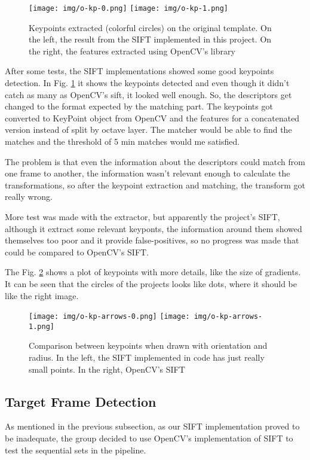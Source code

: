 \documentclass[]{IEEEtran}
\begin{document}
 \begin{figure}[H]
     \centering
     \texttt{[image: img/o-kp-0.png]}
     \texttt{[image: img/o-kp-1.png]}
     \caption{Keypoints extracted (colorful circles) on the original template. On the left, the result from the SIFT implemented in this project. On the right, the features extracted using OpenCV's library}
     \label{fig:keypoints}
 \end{figure}

 After some tests, the SIFT implementations showed some good keypoints detection. In Fig. \ref{fig:keypoints} it shows the keypoints detected and even though it didn't catch as many as OpenCV's sift, it looked well enough. So, the descriptors get changed to the format expected by the matching part. The keypoints got converted to KeyPoint object from OpenCV and the features for a concatenated version instead of split by octave layer. The matcher would be able to find the matches and the threshold of 5 min matches would me satisfied.

 The problem is that even the information about the descriptors could match from one frame to another, the information wasn't relevant enough to calculate the transformations, so after the keypoint extraction and matching, the transform got really wrong.

 More test was made with the extractor, but apparently the project's SIFT, although it extract some relevant keyponts, the information around them showed themselves too poor and it provide false-positives, so no progress was made that could be compared to OpenCV's SIFT.

 The Fig. \ref{fig:keypoints_arrow} shows a plot of keypoints with more details, like the size of gradients. It can be seen that the circles of the projects looks like dots, where it should be like the right image.

\begin{figure}[H]
     \centering
     \texttt{[image: img/o-kp-arrows-0.png]}
     \texttt{[image: img/o-kp-arrows-1.png]}
     \caption{Comparison between keypoints when drawn with orientation and radius. In the left, the SIFT implemented in code has just really small points. In the right, OpenCV's SIFT }
     \label{fig:keypoints_arrow}
 \end{figure}



\subsection{Target Frame Detection}
As mentioned in the previous subsection, as our SIFT implementation proved to be inadequate, the group decided to use OpenCV's implementation of SIFT to test the sequential sets in the pipeline.
\end{document}
